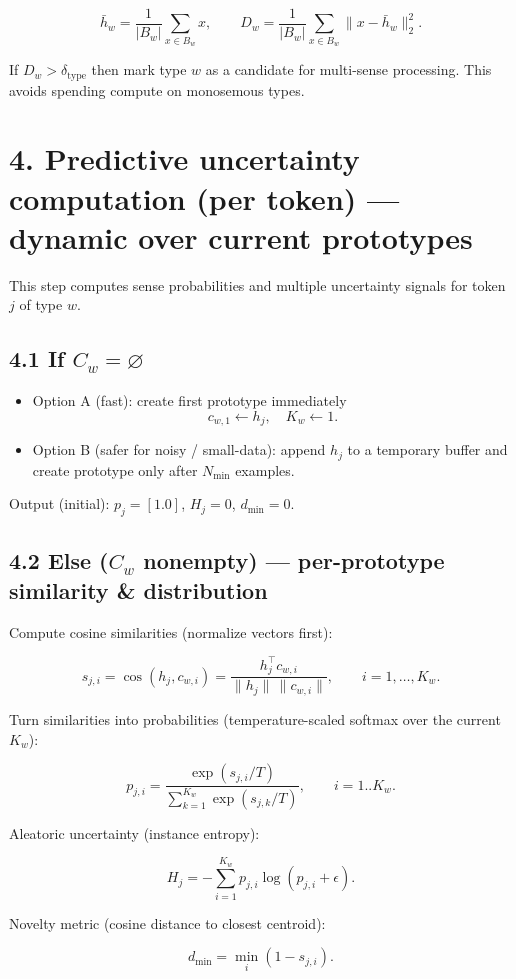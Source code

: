\documentclass[a4paper,12pt]{article}
\begin{document}
\[
\bar{h}_w = \frac{1}{|B_w|} \sum_{x \in B_w} x, \qquad
D_w = \frac{1}{|B_w|} \sum_{x \in B_w} \|x - \bar{h}_w\|_2^2.
\]

If $D_w > \delta_{\text{type}}$ then mark type $w$ as a candidate for multi-sense processing. This avoids spending compute on monosemous types.

\section*{4. Predictive uncertainty computation (per token) --- dynamic over current prototypes}
This step computes sense probabilities and multiple uncertainty signals for token $j$ of type $w$.

\subsection*{4.1 If $C_w = \varnothing$}
\begin{itemize}
    \item Option A (fast): create first prototype immediately
    \[
    c_{w,1} \leftarrow h_j, \quad K_w \leftarrow 1.
    \]
    \item Option B (safer for noisy / small-data): append $h_j$ to a temporary buffer and create prototype only after $N_{\min}$ examples.
\end{itemize}
Output (initial): $p_j = [1.0]$, $H_j = 0$, $d_{\min} = 0$.

\subsection*{4.2 Else ($C_w$ nonempty) --- per-prototype similarity \& distribution}
Compute cosine similarities (normalize vectors first):

\[
s_{j,i} = \cos(h_j, c_{w,i}) = \frac{h_j^\top c_{w,i}}{\|h_j\| \, \|c_{w,i}\|}, \qquad i = 1, \ldots, K_w.
\]

Turn similarities into probabilities (temperature-scaled softmax over the current $K_w$):

\[
p_{j,i} = \frac{\exp(s_{j,i}/T)}{\sum_{k=1}^{K_w} \exp(s_{j,k}/T)}, \qquad i = 1..K_w.
\]

Aleatoric uncertainty (instance entropy):

\[
H_j = -\sum_{i=1}^{K_w} p_{j,i} \log(p_{j,i} + \epsilon).
\]

Novelty metric (cosine distance to closest centroid):

\[
d_{\min} = \min_i (1 - s_{j,i}).
\]
\end{document}
